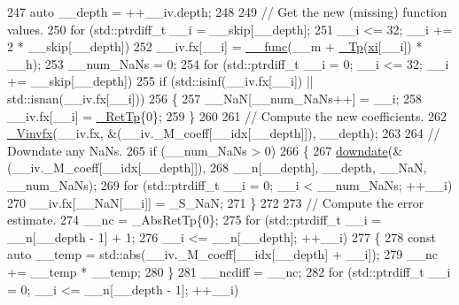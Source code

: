 \begin{DoxyCode}
247               \textcolor{keyword}{auto} \_\_depth = ++\_\_iv.depth;
248 
249               \textcolor{comment}{// Get the new (missing) function values.}
250               \textcolor{keywordflow}{for} (std::ptrdiff\_t \_\_i = \_\_skip[\_\_depth];
251                         \_\_i <= 32; \_\_i += 2 * \_\_skip[\_\_depth])
252                 \_\_iv.fx[\_\_i] = \hyperlink{namespace____gnu__cxx_af2b2f0c7a2ae72b922b1afefae5a65b2}{\_\_func}(\_\_m + \hyperlink{namespace____gnu__cxx_a3b19a9c800ca194374ef9172290f7d79}{\_Tp}(\hyperlink{namespace____gnu__cxx_a8a912ee89c90a7e5049ce5ffad04274b}{xi}[\_\_i]) * \_\_h);
253               \_\_num\_NaNs = 0;
254               \textcolor{keywordflow}{for} (std::ptrdiff\_t \_\_i = 0; \_\_i <= 32; \_\_i += \_\_skip[\_\_depth])
255                 \textcolor{keywordflow}{if} (std::isinf(\_\_iv.fx[\_\_i]) || std::isnan(\_\_iv.fx[\_\_i]))
256                   \{
257                     \_\_NaN[\_\_num\_NaNs++] = \_\_i;
258                     \_\_iv.fx[\_\_i] = \hyperlink{namespace____gnu__cxx_a886e03ece3d53ff7fa6c098a40f93fa5}{\_RetTp}\{0\};
259                   \}
260 
261               \textcolor{comment}{// Compute the new coefficients.}
262               \hyperlink{namespace____gnu__cxx_a6215f0335d2b6f478726299660ccca4e}{\_Vinvfx}(\_\_iv.fx, &(\_\_iv.\_M\_coeff[\_\_idx[\_\_depth]]), \_\_depth);
263 
264               \textcolor{comment}{// Downdate any NaNs.}
265               \textcolor{keywordflow}{if} (\_\_num\_NaNs > 0)
266                 \{
267                   \hyperlink{namespace____gnu__cxx_a3a0de8d324d776aa6b7f631559da4d7c}{downdate}(&(\_\_iv.\_M\_coeff[\_\_idx[\_\_depth]]),
268                            \_\_n[\_\_depth], \_\_depth, \_\_NaN, \_\_num\_NaNs);
269                   \textcolor{keywordflow}{for} (std::ptrdiff\_t \_\_i = 0; \_\_i < \_\_num\_NaNs; ++\_\_i)
270                     \_\_iv.fx[\_\_NaN[\_\_i]] = \_S\_NaN;
271                 \}
272 
273               \textcolor{comment}{// Compute the error estimate.}
274               \_\_nc = \_AbsRetTp\{0\};
275               \textcolor{keywordflow}{for} (std::ptrdiff\_t \_\_i = \_\_n[\_\_depth - 1] + 1;
276                    \_\_i <= \_\_n[\_\_depth]; ++\_\_i)
277                 \{
278                   \textcolor{keyword}{const} \textcolor{keyword}{auto} \_\_temp = std::abs(\_\_iv.\_M\_coeff[\_\_idx[\_\_depth] + \_\_i]);
279                   \_\_nc += \_\_temp * \_\_temp;
280                 \}
281               \_\_ncdiff = \_\_nc;
282               \textcolor{keywordflow}{for} (std::ptrdiff\_t \_\_i = 0; \_\_i <= \_\_n[\_\_depth - 1]; ++\_\_i)

\end{DoxyCode}
